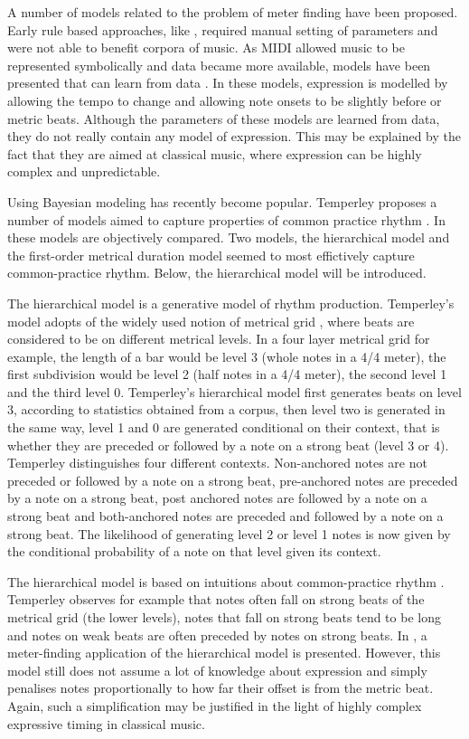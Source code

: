A number of models related to the problem of meter finding have been proposed. Early rule based approaches, like \citet{longuet1976perception}, required manual setting of parameters and were not able to benefit corpora of music. As MIDI allowed music to be represented symbolically and data became more available, models have been presented that can learn from data \citep{cemgil2000rhythm, raphael2002hybrid}. In these models, expression is modelled by allowing the tempo to change and allowing note onsets to be slightly before or metric beats. Although the parameters of these models are learned from data, they do not really contain any model of expression. This may be explained by the fact that they are aimed at classical music, where expression can be highly complex and unpredictable.

Using Bayesian modeling has recently become popular. Temperley proposes a number of models aimed to capture properties of common practice rhythm \citep{temperley2010modeling}. In \citet{temperley2010} these models are objectively compared. Two models, the hierarchical model and the first-order metrical duration model seemed to most effictively capture common-practice rhythm. Below, the hierarchical model will be introduced.

The hierarchical model is a generative model of rhythm production. Temperley's model adopts of the widely used notion of metrical grid \citep{lerdahl1983generative}, where beats are considered to be on different metrical levels. In a four layer metrical grid for example, the length of a bar would be level 3 (whole notes in a 4/4 meter), the first subdivision would be level 2 (half notes in a 4/4 meter), the second level 1 and the third level 0. Temperley's hierarchical model first generates beats on level 3, according to statistics obtained from a corpus, then level two is generated in the same way, level 1 and 0 are generated conditional on their context, that is whether they are preceded or followed by a note on a strong beat (level 3 or 4). Temperley distinguishes four different contexts. Non-anchored notes are not preceded or followed by a note on a strong beat, pre-anchored notes are preceded by a note on a strong beat, post anchored notes are followed by a note on a strong beat and both-anchored notes are preceded and followed by a note on a strong beat. The likelihood of generating level 2 or level 1 notes is now given by the conditional probability of a note on that level given its context.

The hierarchical model is based on intuitions about common-practice rhythm \citep{temperley2010modeling}. Temperley observes for example that notes often fall on strong beats of the metrical grid (the lower levels), notes that fall on strong beats tend to be long and notes on weak beats are often preceded by notes on strong beats. In \citet{temperley2009unified}, a meter-finding application of the hierarchical model is presented. However, this model still does not assume a lot of knowledge about expression and simply penalises notes proportionally to how far their offset is from the metric beat. Again, such a simplification may be justified in the light of highly complex expressive timing in classical music.

